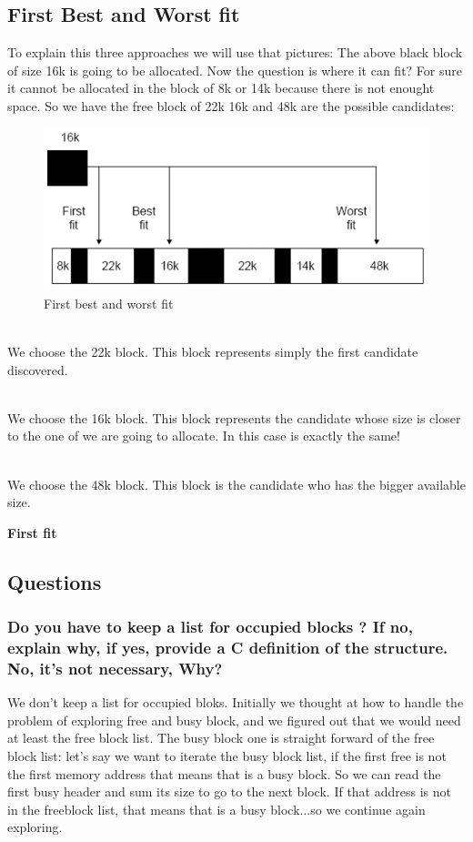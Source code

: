\documentclass[11pt]{article}
\begin{document}
\subsection{First Best and Worst fit}
To explain this three approaches we will use that pictures:
The above black block of size 16k is going to be allocated. Now the question is where it can fit? For sure it cannot be allocated in the block of 8k or 14k because there is not enought space. So we have the free block of 22k 16k and 48k are the possible candidates:
\begin{description}
\begin{figure}[H]
\centering
\includegraphics*{fbw}
\caption{First best and worst fit}
\end{figure}
  \item[First fit] \hfill \\
	We choose the 22k block. This block represents simply the first candidate discovered.
  \item[Best fit] \hfill \\
  	We choose the 16k block. This block represents the candidate whose size is closer to the one of we are going to allocate. In this case is exactly the same!
  \item[Worst fit] \hfill \\
	We choose the 48k block. This block is the candidate who has the bigger available size.
\end{description}

\textbf{First fit}\\
\subsection{Questions}

\subsubsection*{Do you have to keep a list for occupied blocks ? If no, explain why, if yes, provide a C definition of the structure.
No, it's not necessary, Why?}
We don't keep a list for occupied bloks. Initially we thought at how to handle the problem of exploring free and busy block, and we figured out that we would need at least the free block list. The busy block one is straight forward of the free block list: let's say we want to iterate the busy block list, if the first free is not the first memory address that means that is a busy block. So we can read the first busy header and sum its size to go to the next block. If that address is not in the freeblock list, that means that is a busy block...so we continue again exploring.
\end{document}
